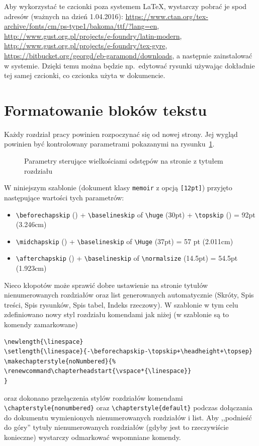 Aby wykorzystać te czcionki poza systemem LaTeX, wystarczy pobrać je spod adresów (ważnych na dzień
1.04.2016): 
\url{https://www.ctan.org/tex-archive/fonts/cm/ps-type1/bakoma/ttf/?lang=en}, \url{http://www.gust.org.pl/projects/e-foundry/latin-modern}, \url{http://www.gust.org.pl/projects/e-foundry/tex-gyre}, \url{https://bitbucket.org/georgd/eb-garamond/downloads},
a następnie zainstalować w systemie. Dzięki temu można będzie np.~edytować rysunki używając dokładnie tej samej czcionki, co czcionka użyta w dokumencie.

\section{Formatowanie bloków tekstu}
Każdy rozdział pracy powinien rozpoczynać się od nowej strony. Jej wygląd powinien być kontrolowany parametrami pokazanymi na rysunku~\ref{fig:LayChap}.
\begin{figure}[t]
\centering
\chapterdiagram
\caption{Parametry sterujące wielkościami odstępów na stronie z tytułem rozdziału} 
\label{fig:LayChap}
\end{figure}
W niniejszym szablonie (dokument klasy \texttt{memoir} z opcją \texttt{[12pt]}) przyjęto następujące wartości tych parametrów:
\begin{itemize}
\item \verb?\beforechapskip? (\printlength{\beforechapskip}) + \verb?\baselineskip? of \verb+\huge+ (30pt) + \verb+\topskip+ (\printlength{\topskip}) = 92pt (3.246cm)
\item \verb?\midchapskip? (\printlength{\midchapskip}) + \verb?\baselineskip? of \verb+\Huge+ (37pt) = 57 pt (2.011cm)
\item \verb?\afterchapskip? (\printlength{\afterchapskip}) + \verb+\baselineskip+ of \verb+\normalsize+ (14.5pt) = 54.5pt (1.923cm)
\end{itemize}

Nieco kłopotów może sprawić dobre ustawienie na stronie tytułów nienumerowanych rozdziałów oraz list generowanych automatycznie (Skróty, Spis treści, Spis rysunków, Spis tabel, Indeks rzeczowy). W szablonie w tym celu zdefiniowano nowy styl rozdziału komendami jak niżej (w szablonie są to komendy zamarkowane)
\begin{lstlisting}[basicstyle=\footnotesize\ttfamily]
\newlength{\linespace}
\setlength{\linespace}{-\beforechapskip-\topskip+\headheight+\topsep}
\makechapterstyle{noNumbered}{%
\renewcommand\chapterheadstart{\vspace*{\linespace}}
}
\end{lstlisting}
oraz dokonano przełączenia stylów rozdziałów komendami \verb?\chapterstyle{nonumbered}? oraz \verb?\chapterstyle{default}? podczas dołączania do dokumentu wymienionych nienumerowanych rozdziałów i list. Aby ,,podnieść do góry'' tytuły nienumerowanych rozdziałów (gdyby jest to rzeczywiście konieczne) wystarczy odmarkować wspomniane komendy.

